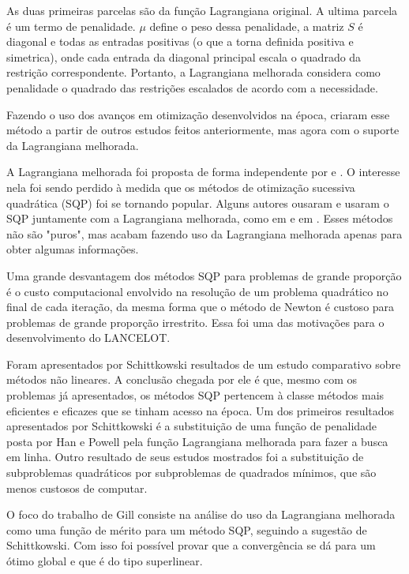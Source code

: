 As duas primeiras parcelas são da função Lagrangiana original. A ultima parcela é um termo
de penalidade. \(\mu\) define o peso dessa penalidade, a matriz \(S\) é diagonal e todas
as entradas positivas (o que a torna definida positiva e simetrica), onde cada entrada
da diagonal principal escala o quadrado da restrição correspondente. Portanto, a Lagrangiana
melhorada considera como penalidade o quadrado das restrições escalados de acordo com a
necessidade.

Fazendo o uso dos avanços em otimização desenvolvidos na época, criaram esse método a partir
de outros estudos feitos anteriormente, mas agora com o suporte da Lagrangiana melhorada.

A Lagrangiana melhorada foi proposta de forma independente por \cite{hestenes1969multiplier}
e \cite{powell1969method}. O interesse nela foi sendo perdido à medida que os métodos
de otimização sucessiva quadrática (SQP) foi se tornando popular. Alguns autores ousaram e
usaram o SQP juntamente com a Lagrangiana melhorada, como em \cite{schittkowski1982nonlinear}
e em \cite{gill1986some}. Esses métodos não são "puros", mas acabam fazendo uso da Lagrangiana
melhorada apenas para obter algumas informações.

Uma grande desvantagem dos métodos SQP para problemas de grande proporção é o custo computacional
envolvido na resolução de um problema quadrático no final de cada iteração, da mesma forma que
o método de Newton é custoso para problemas de grande proporção irrestrito. Essa foi uma das
motivações para o desenvolvimento do LANCELOT.

Foram apresentados por Schittkowski \cite{schittkowski1982nonlinear} resultados de um estudo
comparativo sobre métodos não lineares. A conclusão chegada por ele é que, mesmo com os problemas
já apresentados, os métodos SQP pertencem à classe métodos mais eficientes e eficazes que se tinham
acesso na época. Um dos primeiros resultados apresentados por Schittkowski é a substituição de uma
função de penalidade posta por Han e Powell pela função Lagrangiana melhorada para fazer a busca em linha.
Outro resultado de seus estudos mostrados foi a substituição de subproblemas quadráticos por
subproblemas de quadrados mínimos, que são menos custosos de computar.

O foco do trabalho de Gill \cite{gill1986some} consiste na análise do uso da Lagrangiana melhorada
como uma função de mérito para um método SQP, seguindo a sugestão de Schittkowski. Com isso foi
possível provar que a convergência se dá para um ótimo global e que é do tipo superlinear.



